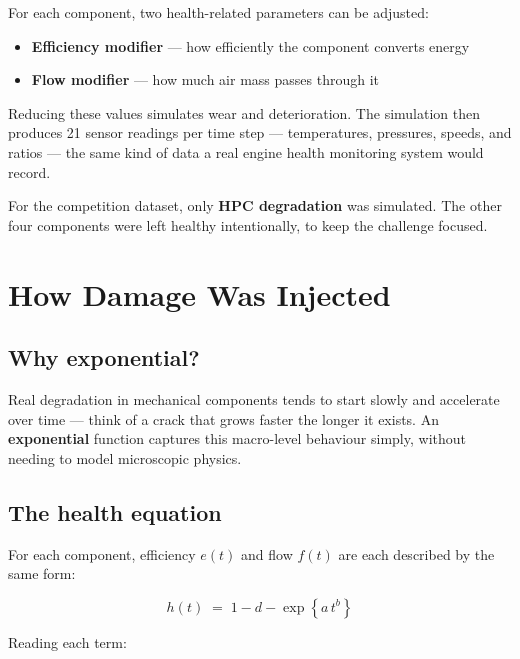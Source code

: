 \documentclass[11pt, a4paper]{article}
\begin{document}
For each component, two health-related parameters can be adjusted:
\begin{itemize}[noitemsep]
  \item \textbf{Efficiency modifier} --- how efficiently the component
        converts energy
  \item \textbf{Flow modifier} --- how much air mass passes through it
\end{itemize}

Reducing these values simulates wear and deterioration.
The simulation then produces 21 sensor readings per time step ---
temperatures, pressures, speeds, and ratios --- the same kind of data
a real engine health monitoring system would record.

For the competition dataset, only \textbf{HPC degradation} was simulated.
The other four components were left healthy intentionally, to keep the
challenge focused.

\section{How Damage Was Injected}

\subsection{Why exponential?}

Real degradation in mechanical components tends to start slowly and
accelerate over time --- think of a crack that grows faster the longer it
exists. An \textbf{exponential} function captures this macro-level
behaviour simply, without needing to model microscopic physics.

\subsection{The health equation}

For each component, efficiency $e(t)$ and flow $f(t)$ are each described
by the same form:

\begin{equation}
  h(t) \;=\; 1 - d - \exp\!\left\{a\,t^{b}\right\}
  \label{eq:health}
\end{equation}

Reading each term:
\end{document}
